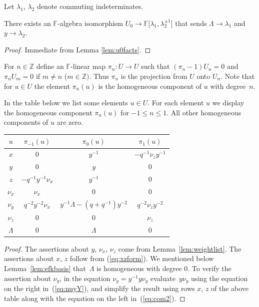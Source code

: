 Let $\lambda_1$, $\lambda_2$ denote commuting
indeterminates.

\begin{Corollary}
\label{cor:laurant}
There exists an  $\mathbb F$-algebra isomorphism
$U_0 \to \mathbb F\lbrack \lambda_1, \lambda^{\pm 1}_2]$
that sends
$\Lambda \to \lambda_1$
and
$y \to \lambda_2$.
\end{Corollary}

\begin{proof}
Immediate from Lemma
\ref{lem:u0facts}.
\end{proof}

\begin{Definition}
\rm For $n \in \mathbb Z$ def\/ine an $\mathbb F$-linear map
$\pi_n:
U \to
U
$
such that $(\pi_n-1)U_n=0$ and
$\pi_n U_m=0$ if $m\not=n$  ($m\in \mathbb Z)$.
Thus $\pi_n$ is the projection
from $U $ onto $U_n$.
Note that for $u \in
U$ the element
$\pi_n(u)$
is the homogeneous component of $u$ with degree~$n$.
\end{Definition}

\begin{Lemma}
\label{lem:firsttable}
In the table below we list some
elements $u \in
U$.
For each element $u$ we display the homogeneous
component
$\pi_n(u)$ for $-1\leq n \leq 1$.
All other homogeneous components of $u$ are zero.
\begin{center}
\begin{tabular}{c| c  c c}
$u$ &  $\pi_{-1}(u)$ & $ \pi_0(u)$  & $ \pi_1(u)$
\\
\hline
\hline
$x$ & $0$ & $y^{-1}$ & $-q^{-1} \nu_z y^{-1}$\tsep{2pt}
\\
$y$ & $0$ & $y$ & $0$
\\
$z$ & $-q^{-1}y^{-1}\nu_x$ & $y^{-1}$ & $0$
\\
\hline
$\nu_x$ & $\nu_x$ & $0$ & $0$
\\
$\nu_y$ & $q^{-2}y^{-2}\nu_x$ & $y^{-1}\Lambda-(q+q^{-1})y^{-2}$
& $q^{-2}\nu_z y^{-2}$
\\
$\nu_z$ & $0$ & $0$ & $\nu_z$
\\
\hline
$\Lambda $ & $0$ & $\Lambda $ & $0$
\end{tabular}
        \end{center}
\end{Lemma}
\begin{proof}
The assertions about
$y$, $\nu_x$, $\nu_z$ come  from
Lemma~\ref{lem:weightlist}.
The assertions about $x$, $z$ follow from
(\ref{eq:xzform}).
We mentioned below
Lemma~\ref{lem:efkbasis}
that~$\Lambda $ is homogeneous with degree 0.
To verify the assertion about
$\nu_y$, in the equation $ \nu_y = y^{-1} y \nu_y$
evaluate~$y\nu_y $ using
the equation on the right in~(\ref{eq:nuyY}), and simplify the
result using
rows $x$, $z$ of the above table
along with the
equation on the left in~(\ref{eq:com2}).
\end{proof}


